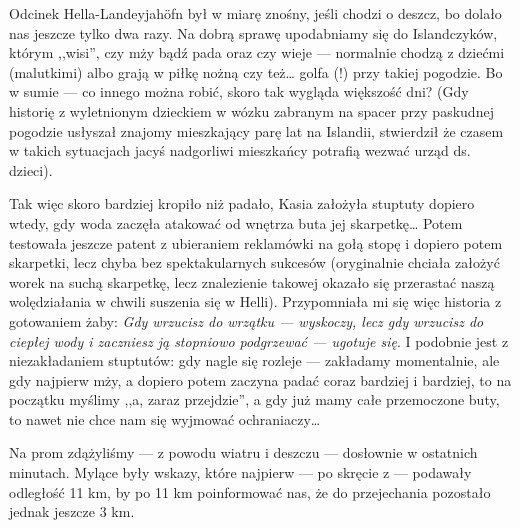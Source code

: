 

Odcinek Hella-Landeyjahöfn był w miarę znośny, jeśli chodzi o deszcz, bo dolało nas jeszcze tylko dwa razy. Na dobrą sprawę upodabniamy się do Islandczyków, którym ,,wisi'', czy mży bądź pada oraz czy wieje --- normalnie chodzą z dziećmi (malutkimi) albo grają w piłkę nożną czy też… golfa (!) przy takiej pogodzie. Bo w sumie --- co innego można robić, skoro tak wygląda większość dni? (Gdy historię z wyletnionym dzieckiem w wózku zabranym na spacer przy paskudnej pogodzie usłyszał znajomy mieszkający parę lat na Islandii, stwierdził że czasem w takich sytuacjach jacyś nadgorliwi mieszkańcy potrafią wezwać urząd ds. dzieci).

Tak więc skoro bardziej kropiło niż padało, Kasia założyła stuptuty dopiero wtedy, gdy woda zaczęła atakować od wnętrza buta jej skarpetkę… Potem testowała jeszcze patent z ubieraniem reklamówki na gołą stopę i dopiero potem skarpetki, lecz chyba bez spektakularnych sukcesów (oryginalnie chciała założyć worek na suchą skarpetkę, lecz znalezienie takowej okazało się przerastać naszą wolędziałania w chwili suszenia się w Helli). Przypomniała mi się więc historia z gotowaniem żaby: \emph{Gdy wrzucisz do wrzątku --- wyskoczy, lecz gdy wrzucisz do ciepłej wody i zaczniesz ją stopniowo podgrzewać --- ugotuje się}. I podobnie jest z niezakładaniem stuptutów: gdy nagle się rozleje --- zakładamy momentalnie, ale gdy najpierw mży, a dopiero potem zaczyna padać coraz bardziej i bardziej, to na początku myślimy ,,a, zaraz przejdzie'', a gdy już mamy całe przemoczone buty, to nawet nie chce nam się wyjmować ochraniaczy…

Na prom zdążyliśmy --- z powodu wiatru i deszczu --- dosłownie w ostatnich minutach. Mylące były wskazy, które najpierw --- po skręcie z  --- podawały odległość 11 km, by po 11 km poinformować nas, że do przejechania pozostało jednak jeszcze 3 km.

